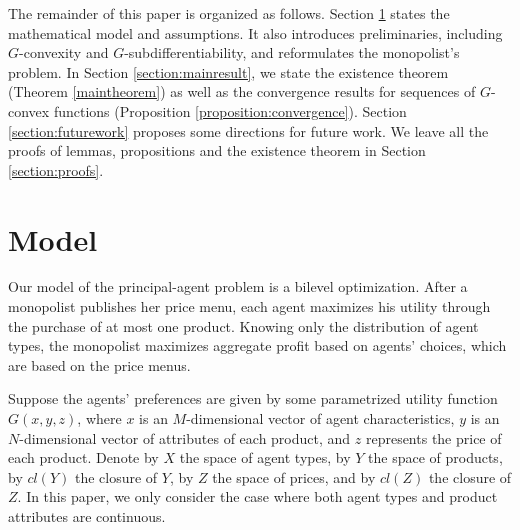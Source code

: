 \documentclass[a4paper, 11pt]{amsart}
\numberwithin{equation}{section}
\theoremstyle{plain}
\theoremstyle{definition}
\theoremstyle{remark}
\begin{document}
 



The remainder of this paper is organized as follows. Section \ref{section:model} states the mathematical model and assumptions. It also introduces preliminaries, including $G$-convexity and $G$-subdifferentiability, and reformulates the monopolist's problem. In Section \ref{section:mainresult}, we state the existence theorem (Theorem \ref{maintheorem}) as well as the convergence results for sequences of $G$-convex functions (Proposition \ref{proposition:convergence}). Section \ref{section:futurework} proposes some directions for future work. We leave all the proofs of lemmas, propositions and the existence theorem in Section \ref{section:proofs}. 
 

\bigskip
 

\section{Model}\label{section:model}



{Our model of the principal-agent problem is a bilevel optimization. After a monopolist publishes her price menu, each agent maximizes his utility through the purchase of at most one product. Knowing only the distribution of agent types, the monopolist maximizes aggregate profit based on agents' choices, which are based on the price menus.}\medskip


Suppose the agents' preferences are given by some parametrized utility function  $G(x, y, z)$, where $x$ is an $M$-dimensional vector of agent characteristics, $y$ is an $N$-dimensional vector of attributes of each product, and $z$ represents the price of each product. Denote {by} $X$ the space of agent types, by $Y$ the space of products, by $cl(Y)$ the closure of $Y$, by $Z$ the space of prices, and by $cl(Z)$ the closure of $Z$. {In this paper, we only consider the case where both agent types and product attributes are continuous.} \medskip
\end{document}
